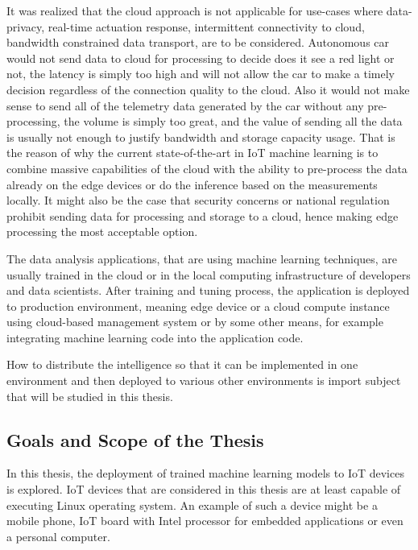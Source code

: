 \documentclass[english, 12pt, a4paper, elec, utf8, online]{aaltothesis}
\begin{document}
It was realized that the cloud approach is not applicable for use-cases where data-privacy, real-time actuation response, intermittent connectivity to cloud, bandwidth constrained data transport, are to be considered. Autonomous car would not send data to cloud for processing to decide does it see a red light or not, the latency is simply too high and will not allow the car to make a timely decision regardless of the connection quality to the cloud. Also it would not  make sense to send all of the telemetry data generated by the car without any pre-processing, the volume is simply too great, and the value of sending all the data is usually not enough to justify bandwidth and storage capacity usage. That is the reason of why the current state-of-the-art in IoT machine learning is to combine massive capabilities of the cloud with the ability to pre-process the data already on the edge devices or do the inference based on the measurements locally.  It might also be the case that security concerns or national regulation prohibit sending data for processing and storage to a cloud, hence making edge processing the most acceptable option.~\cite{stolpe2016internet} 

The data analysis applications, that are using machine learning techniques, are usually trained in the cloud or in the local computing infrastructure of developers and data scientists. After training and tuning process, the application is deployed to production environment, meaning edge device or a cloud compute instance using cloud-based management system or by some other means, for example integrating machine learning code into the application code. %

How to distribute the intelligence so that it can be implemented in one environment and then deployed to various other environments is import subject that will be studied in this thesis.

\subsection{Goals and Scope of the Thesis}
In this thesis, the deployment of trained machine learning models to IoT devices is explored. IoT devices that are considered in this thesis are at least capable of executing Linux operating system. An example of such a device might be a mobile phone, IoT board with Intel processor for embedded applications or even a personal computer.
\end{document}
